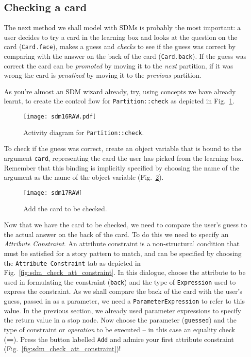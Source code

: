 \newpage
\subsection{Checking a card}

The next method we shall model with SDMs is probably the most important: a user decides to try a card in the learning box and looks at the question on the card
(\texttt{Card.face}), makes a guess and \emph{checks} to see if the guess was correct by comparing with the answer on the back of the card (\texttt{Card.back}).
If the guess was correct the card can be \emph{promoted} by moving it to the \emph{next} partition, if it was wrong the card is \emph{penalized} by moving it to
the \emph{previous} partition.

As you're almost an SDM wizard already, try, using concepts we have already learnt, to create the control flow for \texttt{Partition::check} as depicted in
Fig.~\ref{fig:sdm_check_start}.

\begin{figure}[htbp]
\begin{center}
  \texttt{[image: sdm16RAW.pdf]}
  \caption{Activity diagram for \texttt{Partition::check}.}
  \label{fig:sdm_check_start}
\end{center}
\end{figure}

To check if the guess was correct, create an object variable that is bound to the argument \texttt{card}, representing the card the user has picked from the
learning box. Remember that this binding is implicitly specified by choosing the name of the argument as the name of the object variable 
(Fig.~\ref{fig:sdm_check_addCard}).

\begin{figure}[htbp]
\begin{center}
  \texttt{[image: sdm17RAW]}
  \caption{Add the card to be checked.}
  \label{fig:sdm_check_addCard}
\end{center}
\end{figure}

Now that we have the card to be checked, we need to compare the user's guess to the actual answer on the back of the card. To do this
we need to specify an \emph{Attribute Constraint}. An attribute constraint is a non-structural condition that must be satisfied for a story pattern to match,
and can be specified by choosing the \texttt{Attribute Constraint} tab as depicted in Fig.~\ref{fig:sdm_check_att_constraint}. In this dialogue, choose the
attribute to be used in formulating the constraint (\texttt{back}) and the type of \texttt{Expression} used to express the constraint. As we shall compare the
back of the card with the user's guess, passed in as a parameter, we need a \texttt{ParameterExpression} to refer to this value.
In the previous section, we already used parameter expressions to specify the return value in a stop node. Now choose the parameter (\texttt{guessed}) and the
type of constraint or \emph{operation} to be executed -- in this case an equality check (\texttt{==}). Press the button labelled \texttt{Add} and admire your
first attribute constraint (Fig.~\ref{fig:sdm_check_att_constraint})!

